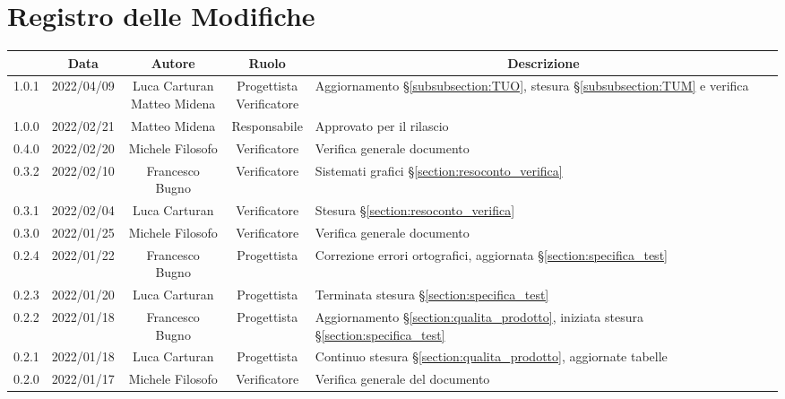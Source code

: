 \thispagestyle{empty}
\section*{Registro delle Modifiche}

\begin{center}
	\renewcommand{\arraystretch}{1.8}
	\begin{longtable}[c]{c | c | c | c | p{5cm}}
		\rowcolor[HTML]{125E28}
		\multicolumn{1}{c}{\color[HTML]{FFFFFF} \textbf{Versione}} & 
		\multicolumn{1}{c}{\color[HTML]{FFFFFF} \textbf{Data}} & 
		\multicolumn{1}{c}{\color[HTML]{FFFFFF} \textbf{Autore}} & 
		\multicolumn{1}{c}{\color[HTML]{FFFFFF} \textbf{Ruolo}} & 
		\multicolumn{1}{c}{\color[HTML]{FFFFFF} \textbf{Descrizione}} \\
		\endhead
		1.0.1 & 2022/04/09 & \Longunderstack{Luca Carturan \\ Matteo Midena} & \Longunderstack{Progettista \\ Verificatore} & Aggiornamento §\ref{subsubsection:TUO}, stesura §\ref{subsubsection:TUM} e verifica\\
		1.0.0 & 2022/02/21 & Matteo Midena & Responsabile & Approvato per il rilascio\\
		0.4.0 & 2022/02/20 & Michele Filosofo & Verificatore & Verifica generale documento\\
		0.3.2 & 2022/02/10 & Francesco Bugno & Verificatore & Sistemati grafici §\ref{section:resoconto_verifica}\\
		0.3.1 & 2022/02/04 & Luca Carturan & Verificatore & Stesura §\ref{section:resoconto_verifica}\\
		0.3.0 & 2022/01/25 & Michele Filosofo & Verificatore & Verifica generale documento\\
		0.2.4 & 2022/01/22 & Francesco Bugno & Progettista & Correzione errori ortografici, aggiornata §\ref{section:specifica_test}\\
		0.2.3 & 2022/01/20 & Luca Carturan & Progettista & Terminata stesura §\ref{section:specifica_test}\\
		0.2.2 & 2022/01/18 & Francesco Bugno & Progettista & Aggiornamento §\ref{section:qualita_prodotto}, iniziata stesura §\ref{section:specifica_test}\\
		0.2.1 & 2022/01/18 & Luca Carturan & Progettista & Continuo stesura §\ref{section:qualita_prodotto}, aggiornate tabelle\\
		0.2.0 & 2022/01/17 & Michele Filosofo & Verificatore & Verifica generale del documento\\

\end{longtable}
\end{center}
